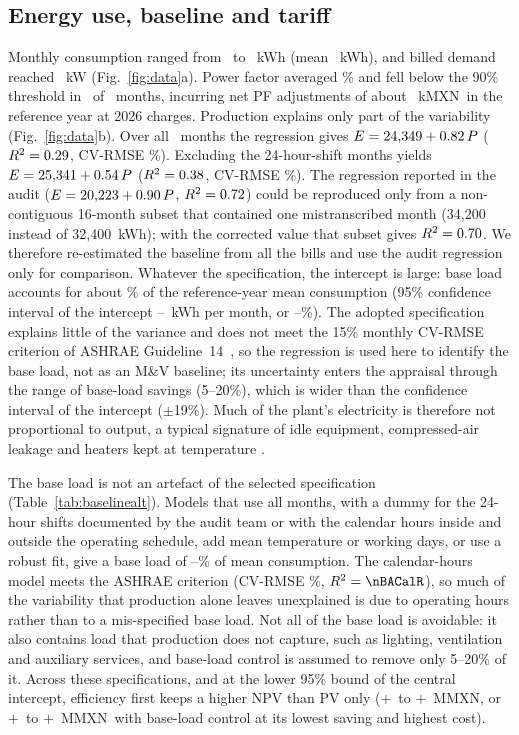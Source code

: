 \documentclass[preprint,12pt,authoryear]{elsarticle}
\newcommand{\MXN}{MXN}
\begin{document}
\subsection{Energy use, baseline and tariff}
\label{sec:baseres}
Monthly consumption ranged from \nKWhMin\ to \nKWhMax~kWh (mean \nKWhMean~kWh), and billed demand reached \nKWMax~kW (Fig.~\ref{fig:data}a). Power factor averaged \nPFMean\% and fell below the 90\% threshold in \nMonthsPFLow\ of \nNMonths\ months, incurring net PF adjustments of about \nPFSurcharge~k\MXN\ in the reference year at 2026 charges. Production explains only part of the variability (Fig.~\ref{fig:data}b). Over all \nNAll\ months the regression gives $E = 24{,}349 + 0.82\,P$ ($R^2 = 0.29$, CV-RMSE \nCVAll\%). Excluding the 24-hour-shift months yields $E = 25{,}341 + 0.54\,P$ ($R^2 = 0.38$, CV-RMSE \nCVExcl\%). The regression reported in the audit ($E = 20{,}223 + 0.90\,P$, $R^2 = 0.72$) could be reproduced only from a non-contiguous 16-month subset that contained one mistranscribed month (34,200 instead of 32,400~kWh); with the corrected value that subset gives $R^2 = 0.70$. We therefore re-estimated the baseline from all the bills and use the audit regression only for comparison. Whatever the specification, the intercept is large: base load accounts for about \nBaseShare\% of the reference-year mean consumption (95\% confidence interval of the intercept \nIntCILo--\nIntCIHi~kWh per month, or \nBaseShareLo--\nBaseShareHi\%). The adopted specification explains little of the variance and does not meet the 15\% monthly CV-RMSE criterion of ASHRAE Guideline~14~\citep{ashrae14}, so the regression is used here to identify the base load, not as an M\&V baseline; its uncertainty enters the appraisal through the range of base-load savings (5--20\%), which is wider than the confidence interval of the intercept ($\pm$19\%). Much of the plant's electricity is therefore not proportional to output, a typical signature of idle equipment, compressed-air leakage and heaters kept at temperature \citep{kara2011,gutowski2009}.

The base load is not an artefact of the selected specification (Table~\ref{tab:baselinealt}). Models that use all months, with a dummy for the 24-hour shifts documented by the audit team or with the calendar hours inside and outside the operating schedule, add mean temperature or working days, or use a robust fit, give a base load of \nBABaseLoSpec--\nBABaseHi\% of mean consumption. The calendar-hours model meets the ASHRAE criterion (CV-RMSE \nBACalCV\%, $R^2 = \nBACalR$), so much of the variability that production alone leaves unexplained is due to operating hours rather than to a mis-specified base load. Not all of the base load is avoidable: it also contains load that production does not capture, such as lighting, ventilation and auxiliary services, and base-load control is assumed to remove only 5--20\% of it. Across these specifications, and at the lower 95\% bound of the central intercept, efficiency first keeps a higher NPV than PV only ($+$\nBAGainLo\ to $+$\nBAGainHi~M\MXN, or $+$\nBALowELo\ to $+$\nBALowEHi~M\MXN\ with base-load control at its lowest saving and highest cost).
\end{document}
